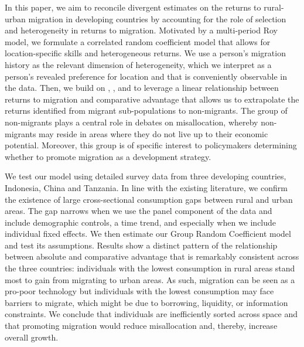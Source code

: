 \documentclass[12pt]{article}
\begin{document}
In this paper, we aim to reconcile divergent estimates on the returns to rural-urban migration in developing countries by accounting for the role of selection and heterogeneity in returns to migration. Motivated by a multi-period Roy model, we formulate a correlated random coefficient model that allows for location-specific skills and heterogeneous returns.  
We use a person’s migration history as the relevant dimension of heterogeneity, which we interpret as a person’s revealed preference for location and that is conveniently observable in the data. 
Then, we build on \cite{suriSelectionComparativeAdvantage2011}, 
\cite{lemieuxEstimatingEffectsUnions1998}, and   \cite{tjernstromCommentSuri2011} to leverage a linear relationship between returns to migration and comparative advantage that allows us to extrapolate the returns identified from migrant sub-populations to non-migrants.
The group of non-migrants plays a central role in debates on misallocation, whereby non-migrants may reside in areas where they do not live up to their economic potential. 
Moreover, this group is of specific interest to policymakers determining whether to promote migration as a development strategy.

We test our model using detailed survey data from three developing countries, Indonesia, China and Tanzania. In line with the existing literature, we confirm the existence of large cross-sectional consumption gaps between rural and urban areas. The gap narrows when we use the panel component of the data and include demographic controls, a time trend, and especially when we include individual fixed effects. 
We then estimate our Group Random Coefficient model and test its assumptions. 
Results show a distinct pattern of the relationship between absolute and comparative advantage that is remarkably consistent across the three countries: individuals with the lowest consumption in rural areas stand most to gain from migrating to urban areas. 
As such, migration can be seen as a pro-poor technology but individuals with the lowest consumption may face barriers to migrate, which might be due to borrowing, liquidity, or information constraints. 
We conclude that individuals are inefficiently sorted across space and that promoting migration would reduce misallocation and, thereby, increase overall growth. 
\end{document}
